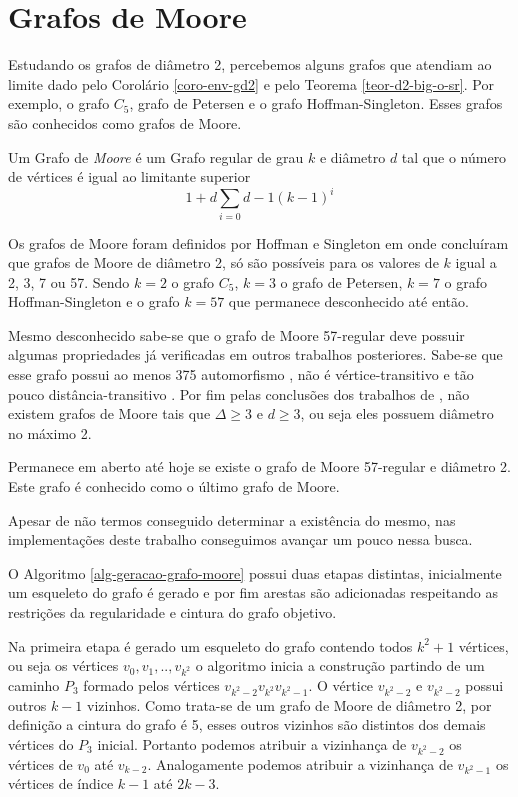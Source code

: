\chapter{Grafos de Moore}
\label{moore}

Estudando os grafos de diâmetro 2, percebemos alguns grafos que atendiam ao limite dado pelo Corolário \ref{coro-env-gd2} e pelo Teorema \ref{teor-d2-big-o-sr}. Por exemplo, o grafo $C_5$, grafo de Petersen e o grafo Hoffman-Singleton. Esses grafos são conhecidos como grafos de Moore. 

Um Grafo de {\it Moore} é um Grafo regular de grau $k$ e diâmetro $d$ tal que o número de vértices é igual ao limitante superior $$1 + d\sum_{i=0}{d-1}(k-1)^i$$

 Os grafos de Moore foram definidos por Hoffman e Singleton em \cite{Hoffman1960} onde concluíram que grafos de Moore de diâmetro 2, só são possíveis para os valores de $k$ igual a 2, 3, 7 ou 57. Sendo $k=2$ o grafo $C_5$, $k=3$ o grafo de Petersen, $k=7$ o grafo Hoffman-Singleton e o grafo $k=57$ que permanece desconhecido até então.

Mesmo desconhecido sabe-se que o grafo de Moore 57-regular deve possuir algumas propriedades já verificadas em outros trabalhos posteriores. Sabe-se que esse grafo possui ao menos 375 automorfismo \cite{Macaj2010}, não é vértice-transitivo \cite{Cameron1983,Miller2005} e tão pouco distância-transitivo \cite{Aschbacher1971,Miller2005}. Por fim pelas conclusões dos trabalhos de \cite{Bannai1973,Damerell1973}, não existem grafos de Moore tais que $\Delta \geq 3$ e $d\geq 3$, ou seja eles possuem diâmetro no máximo 2.

Permanece em aberto até hoje se existe o grafo de Moore 57-regular e diâmetro 2. Este grafo é conhecido como o último grafo de Moore.

Apesar de não termos conseguido determinar a existência do mesmo, nas implementações deste trabalho conseguimos avançar um pouco nessa busca. 



O Algoritmo \ref{alg-geracao-grafo-moore} possui duas etapas distintas, inicialmente um esqueleto do grafo é gerado e por fim arestas são adicionadas respeitando as restrições da regularidade e cintura do grafo objetivo.

Na primeira etapa é gerado um esqueleto do grafo contendo todos $k^2+1$ vértices, ou seja os vértices $v_0, v_1,..,v_{k^2}$ o algoritmo inicia a construção partindo de um caminho $P_3$ formado pelos vértices $v_{k^2-2}v_{k^2}v_{k^2-1}$. O vértice $v_{k^2-2}$ e $v_{k^2-2}$ possui outros $k-1$ vizinhos. Como trata-se de um grafo de Moore de diâmetro 2, por definição a cintura do grafo é 5, esses outros vizinhos são distintos dos demais vértices do $P_3$ inicial. Portanto podemos atribuir a vizinhança de $v_{k^2-2}$ os vértices de $v_0$ até $v_{k-2}$. Analogamente podemos atribuir a vizinhança de $v_{k^2-1}$ os vértices de índice $k-1$ até $2k-3$. 

